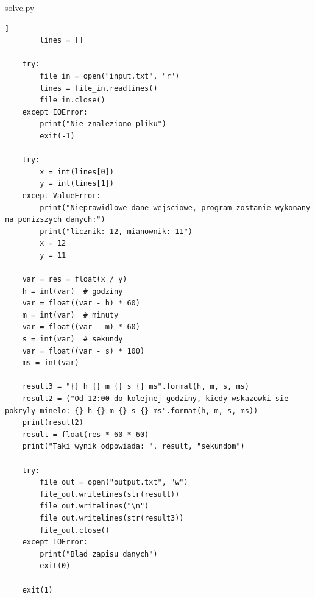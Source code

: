 \documentclass[12pt,a4paper]{article}
\begin{document}
    solve.py
	\begin{lstlisting}]
    	lines = []
    
    try:
        file_in = open("input.txt", "r")
        lines = file_in.readlines()
        file_in.close()
    except IOError:
        print("Nie znaleziono pliku")
        exit(-1)
    
    try:
        x = int(lines[0])
        y = int(lines[1])
    except ValueError:
        print("Nieprawidlowe dane wejsciowe, program zostanie wykonany na ponizszych danych:")
        print("licznik: 12, mianownik: 11")
        x = 12
        y = 11
    
    var = res = float(x / y)
    h = int(var)  # godziny
    var = float((var - h) * 60)
    m = int(var)  # minuty
    var = float((var - m) * 60)
    s = int(var)  # sekundy
    var = float((var - s) * 100)
    ms = int(var)
    
    result3 = "{} h {} m {} s {} ms".format(h, m, s, ms)
    result2 = ("Od 12:00 do kolejnej godziny, kiedy wskazowki sie pokryly minelo: {} h {} m {} s {} ms".format(h, m, s, ms))
    print(result2)
    result = float(res * 60 * 60)
    print("Taki wynik odpowiada: ", result, "sekundom")
    
    try:
        file_out = open("output.txt", "w")
        file_out.writelines(str(result))
        file_out.writelines("\n")
        file_out.writelines(str(result3))
        file_out.close()
    except IOError:
        print("Blad zapisu danych")
        exit(0)
    
    exit(1)

	\end{lstlisting}
	
	
	
	
	
\end{document}
